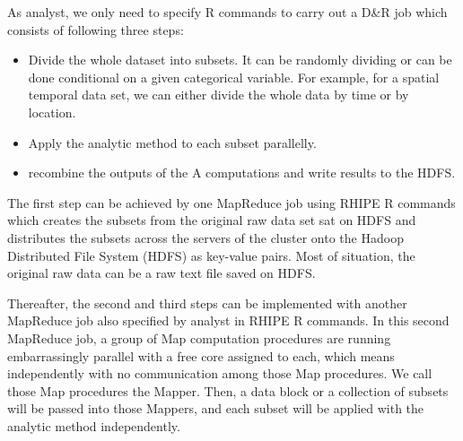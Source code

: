 As analyst, we only need to specify R commands to carry out a D\&R job which
consists of following three steps:
\begin{itemize}
\item Divide the whole dataset into subsets. It can be randomly dividing or
can be done conditional on a given categorical variable. For example, for a spatial
temporal data set, we can either divide the whole data by time or by location. 
\item Apply the analytic method to each subset parallelly.   
\item recombine the outputs of the A computations and write results to the HDFS. 
\end{itemize}  

The first step can be achieved by one MapReduce job using RHIPE R commands which 
creates the subsets from the original raw data set sat on HDFS and 
distributes the subsets across the servers of the cluster onto the Hadoop 
Distributed File System (HDFS) as key-value pairs. Most of situation, the original
raw data can be a raw text file saved on HDFS.

Thereafter, the second and
third steps can be implemented with another MapReduce job also specified by
analyst in RHIPE R commands. In this second MapReduce job, a group of Map
computation procedures are running embarrassingly parallel with a free core 
assigned to each, which means independently with no communication among those Map
procedures. We call those Map procedures the Mapper. Then, a data block or a 
collection of subsets will be passed into those Mappers, and each subset
will be applied with the analytic method independently.

